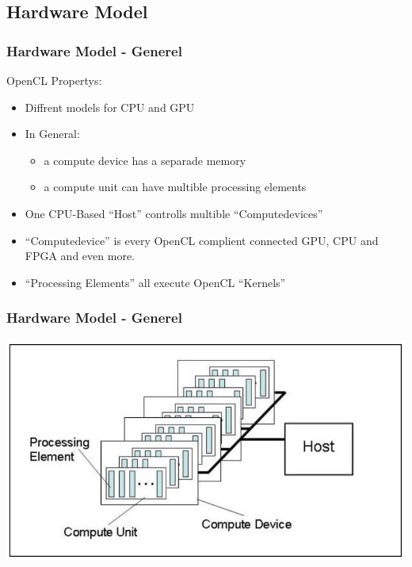 \documentclass{beamer}
\begin{document}
\subsection{Hardware Model}
\begin{frame}
    \frametitle{Hardware Model - Generel}
    OpenCL Propertys:
    \begin{itemize}
     \item Diffrent models for CPU and GPU
     \item In General:
     \begin{itemize}
      \item a compute device has a separade memory
      \item a compute unit can have multible processing elements 
     \end{itemize}
     \item One CPU-Based ``Host'' controlls multible ``Computedevices''
     \item ``Computedevice'' is every OpenCL complient connected GPU, CPU and FPGA and even more. 
     \item ``Processing Elements'' all execute OpenCL ``Kernels''
    \end{itemize}
\end{frame}
\begin{frame}
    \frametitle{Hardware Model - Generel}
    \includegraphics[width=\textwidth]{res/KhronosPlatformModel.png}
\end{frame}
\end{document}
